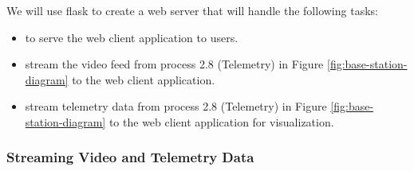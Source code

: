We will use flask to create a web server that will handle the following tasks:

\begin{itemize}
    \item to serve the web client application to users.
    \item stream the video feed from process 2.8 (Telemetry) in Figure \ref{fig:base-station-diagram} to the web client application.
    \item stream telemetry data from process 2.8 (Telemetry) in Figure \ref{fig:base-station-diagram} to the web client application for visualization.
\end{itemize}

\subsubsection{Streaming Video and Telemetry Data}

